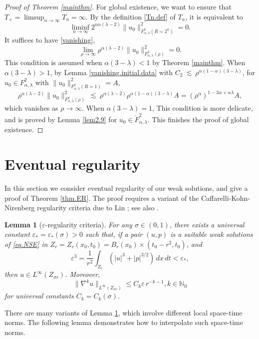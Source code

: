 \documentclass[11pt]{article}
\numberwithin{equation}{section}
\newtheorem{lem}[thm]{Lemma}
\theoremstyle{remark}
\theoremstyle{definition}
\newcommand{\si}{\sigma}
\newcommand{\lec}{{\ \lesssim \ }}
\newcommand\al{\alpha}
\newcommand\e {\varepsilon}  %
\newcommand\la{\lambda}
\newcommand{\I}{\infty}
\begin{document}
\begin{proof}[Proof of Theorem \ref{mainthm}]
For global existence, we want to ensure that $T_+=\limsup_{n \to \infty} T_n = \infty$.
By the definition \eqref{Tn.def} of $T_n$, it is equivalent to
\[
\liminf_{n \to \infty}  2^{n\al(\la-2)} \|u_0\|_{F^2_{\al,\la}(R=2^n)}^2 =0.
\]
It suffices to have \eqref{vanishing},
\[
\lim_{\rho \to \infty}  \rho^{\al(\la-2)} \|u_0\|_{F^2_{\al,\la}(\rho)}^2 =0.
\]
This condition is assumed when $\al(3-\la)<1$ by Theorem \ref{mainthm}. When $\al(3-\la)>1$, by Lemma \ref{vanishing.initial.data}
with $C_2 \lec \rho ^{\al(1-\al)(3-\la)}$, for $u_0\in F^2_{\al,\la}$ with $\|u_0\|^2_{F^{2}_{\al,\lambda}(R=1)}=A$,
\[
\rho^{\al(\la-2)} \|u_0\|^2_{F^{2}_{\al,\lambda}(\rho)} \lec \rho^{\al(\la-2)}  \rho ^{\al(1-\al)(3-\la)}
A= (\rho^\al)^{1-3\al+\al\la}A,
\]
which vanishes as $\rho \to \infty$. When $\al(3-\la)=1$, This condition is more delicate, and is proved by Lemma \ref{lem2.9} for $u_0 \in \mathring F^2_{\al,\la}$. This finishes the proof of global existence.
\end{proof}




\section{Eventual regularity}\label{sec6}



In this section we consider eventual regularity of our weak solutions, and give
 a proof of Theorem \ref{thm.ER}.
The proof requires a variant of the Caffarelli-Kohn-Nirenberg regularity  criteria \cite{CKN} due to Lin \cite{L98}; see also \cite{LS99}.

\begin{lem}[$\e$-regularity criteria]\label{thrm.epsilonreg}
For any $\si\in (0,1)$,
there exists a universal constant $\e_*=\e_*(\si)>0$ such that, if a pair $(u,p)$ is a suitable weak solutions of \eqref{eq.NSE} in
$Z_r=Z_r(x_0,t_0)=B_r(x_0)\times (t_0-r^2,t_0)$,
and
\[
\e^3=\frac 1 {r^2} \int_{Z_r} (|u|^3 +|p|^{3/2})\,dx\,dt <\e_*,
\]
then $u\in L^\I(Z_{\si r})$.
Moreover,
\[
\|  \nabla^k u\|_{L^\I(Z_{\si r})} \leq C_k {\e}\, r^{-k-1}
   , k\in {\mathbb N}_0
\]
for universal constants $C_k=C_k(\si)$.
\end{lem}


There are many variants of Lemma \ref{thrm.epsilonreg}, which involve different local space-time norms. The following lemma demonstrates how to interpolate such space-time norms.  
\end{document}
